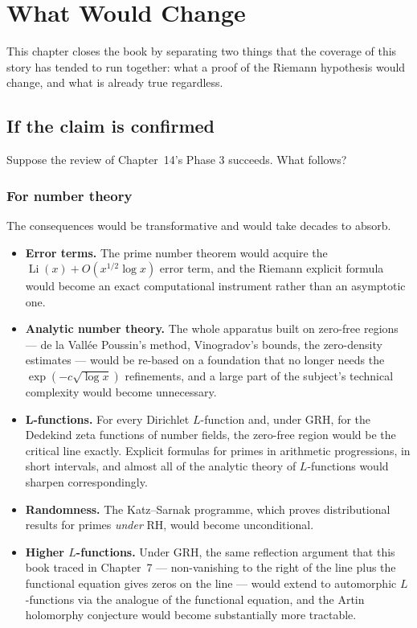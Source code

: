 
\chapter{What Would Change}
\label{ch:consequences}

This chapter closes the book by separating two things that the coverage of
this story has tended to run together: what a proof of the Riemann hypothesis
would change, and what is already true regardless.

\section{If the claim is confirmed}Suppose the review of Chapter~14's Phase 3 succeeds. What follows?

\subsection{For number theory}The consequences would be transformative and would take decades to absorb.

\begin{itemize}
\item \textbf{Error terms.} The prime number theorem would acquire the
$\operatorname{Li}(x) + O(x^{1/2}\log x)$ error term, and the Riemann explicit
formula would become an exact computational instrument rather than an
asymptotic one.
\item \textbf{Analytic number theory.} The whole apparatus built on
zero-free regions --- de la Vallée Poussin's method, Vinogradov's bounds,
the zero-density estimates --- would be re-based on a foundation that no
longer needs the $\exp(-c\sqrt{\log x})$ refinements, and a large part of the
subject's technical complexity would become unnecessary.
\item \textbf{L-functions.} For every Dirichlet $L$-function and, under GRH,
for the Dedekind zeta functions of number fields, the zero-free region would
be the critical line exactly. Explicit formulas for primes in arithmetic
progressions, in short intervals, and almost all of the analytic theory of
$L$-functions would sharpen correspondingly.
\item \textbf{Randomness.} The Katz--Sarnak programme, which proves
distributional results for primes \emph{under} RH, would become unconditional.
\item \textbf{Higher $L$-functions.} Under GRH, the same reflection argument
that this book traced in Chapter~7 --- non-vanishing to the right of the line
plus the functional equation gives zeros on the line --- would extend to
automorphic $L$-functions via the analogue of the functional equation, and
the Artin holomorphy conjecture would become substantially more tractable.
\end{itemize}

